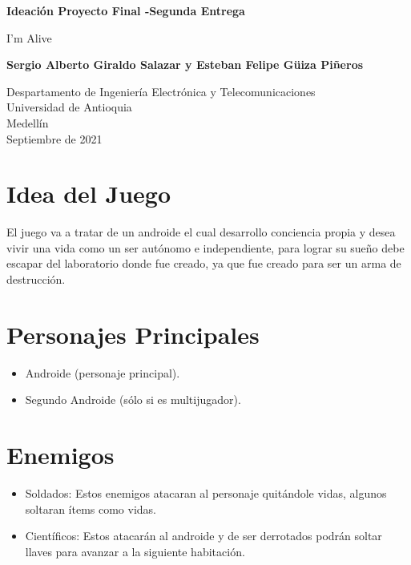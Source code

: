 \documentclass{article}
\begin{document}
\begin{titlepage}
    \begin{center}
        \vspace*{1cm}
            
        \Huge
        \textbf{Ideación Proyecto Final -Segunda Entrega }

        \vspace{0.5cm}
        \LARGE
        I'm Alive
            
        \vspace{1.5cm}
            
        \textbf{Sergio Alberto Giraldo Salazar y Esteban Felipe Güiza Piñeros}
            
        \vfill
            
        \vspace{0.8cm}
            
        \Large
        Despartamento de Ingeniería Electrónica y Telecomunicaciones\\
        Universidad de Antioquia\\
        Medellín\\
        Septiembre de 2021
            
    \end{center}
\end{titlepage}

\tableofcontents
\newpage
\section{Idea del Juego}\label{idea}
El juego va a tratar de un androide el cual desarrollo conciencia propia y desea vivir una vida como un ser autónomo e independiente, para lograr su sueño debe escapar del laboratorio donde fue creado, ya que fue creado para ser un arma de destrucción.
\cite{Alaluzdeunabombilla}

\section{Personajes Principales} \label{personajes}
\begin{itemize}
    \item Androide (personaje principal).
    \item Segundo Androide (sólo si es multijugador).
\end{itemize}

\section{Enemigos}\label{enemigos}
\begin{itemize}
    \item Soldados: Estos enemigos atacaran al personaje quitándole vidas, algunos soltaran ítems como vidas.
    \item Científicos: Estos atacarán al androide y de ser derrotados podrán soltar llaves para avanzar a la siguiente habitación. 
\end{itemize}
\end{document}
